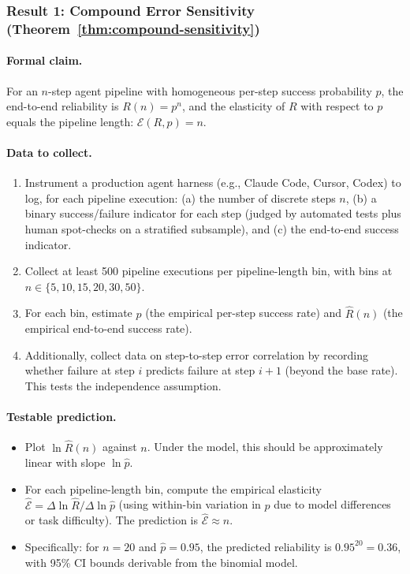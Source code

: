 \documentclass[11pt, a4paper, logo, copyright]{googledeepmind}
\begin{document}
\subsubsection{Result 1: Compound Error Sensitivity (Theorem~\ref{thm:compound-sensitivity})}

\paragraph{Formal claim.} For an $n$-step agent pipeline with homogeneous per-step success probability $p$, the end-to-end reliability is $R(n) = p^n$, and the elasticity of $R$ with respect to $p$ equals the pipeline length: $\mathcal{E}(R,p) = n$.

\paragraph{Data to collect.}
\begin{enumerate}[nosep]
    \item Instrument a production agent harness (e.g., Claude Code, Cursor, Codex) to log, for each pipeline execution: (a) the number of discrete steps $n$, (b) a binary success/failure indicator for each step (judged by automated tests plus human spot-checks on a stratified subsample), and (c) the end-to-end success indicator.
    \item Collect at least 500 pipeline executions per pipeline-length bin, with bins at $n \in \{5, 10, 15, 20, 30, 50\}$.
    \item For each bin, estimate $\hat{p}$ (the empirical per-step success rate) and $\hat{R}(n)$ (the empirical end-to-end success rate).
    \item Additionally, collect data on step-to-step error correlation by recording whether failure at step $i$ predicts failure at step $i+1$ (beyond the base rate). This tests the independence assumption.
\end{enumerate}

\paragraph{Testable prediction.}
\begin{itemize}[nosep]
    \item Plot $\ln \hat{R}(n)$ against $n$. Under the model, this should be approximately linear with slope $\ln \hat{p}$.
    \item For each pipeline-length bin, compute the empirical elasticity $\hat{\mathcal{E}} = \Delta \ln \hat{R} / \Delta \ln \hat{p}$ (using within-bin variation in $p$ due to model differences or task difficulty). The prediction is $\hat{\mathcal{E}} \approx n$.
    \item Specifically: for $n = 20$ and $\hat{p} = 0.95$, the predicted reliability is $0.95^{20} = 0.36$, with 95\% CI bounds derivable from the binomial model.
\end{itemize}
\end{document}
